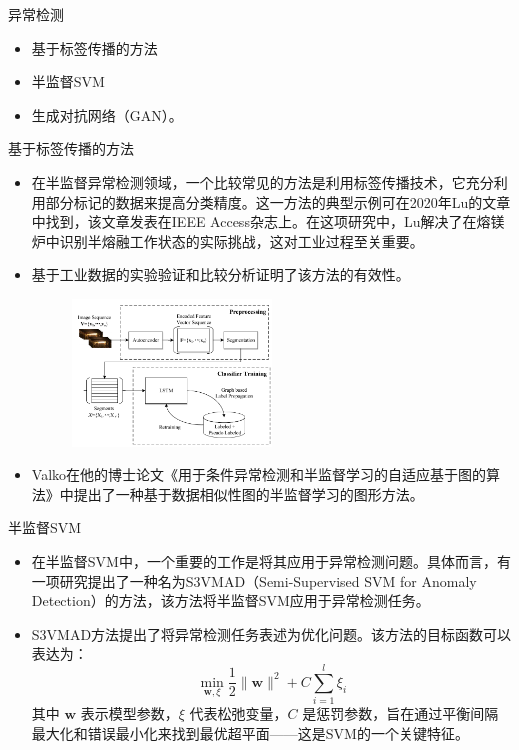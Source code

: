 \documentclass[UTF8]{beamer}
\begin{document}
\begin{frame}{异常检测}
    \begin{itemize}
        \item 基于标签传播的方法
        \item 半监督SVM
        \item 生成对抗网络（GAN）。
    \end{itemize}
\end{frame}

\begin{frame}{基于标签传播的方法}
    \scriptsize
    \begin{itemize}
        \item 在半监督异常检测领域，一个比较常见的方法是利用标签传播技术，它充分利用部分标记的数据来提高分类精度。这一方法的典型示例可在2020年Lu的文章中找到，该文章发表在IEEE Access杂志上。在这项研究中，Lu解决了在熔镁炉中识别半熔融工作状态的实际挑战，这对工业过程至关重要。
        \item 基于工业数据的实验验证和比较分析证明了该方法的有效性。

        \begin{figure}[H]
            \centering
            \includegraphics[width=0.5\textwidth]{img/4-Anomaly Detection/3.png}
        \end{figure}

        \item Valko在他的博士论文《用于条件异常检测和半监督学习的自适应基于图的算法》中提出了一种基于数据相似性图的半监督学习的图形方法。
    \end{itemize}
\end{frame}

\begin{frame}{半监督SVM}
    \small
    \begin{itemize}
        \item 在半监督SVM中，一个重要的工作是将其应用于异常检测问题。具体而言，有一项研究提出了一种名为S3VMAD（Semi-Supervised SVM for Anomaly Detection）的方法，该方法将半监督SVM应用于异常检测任务。
        \item S3VMAD方法提出了将异常检测任务表述为优化问题。该方法的目标函数可以表达为：
        \begin{equation}
        \min_{\mathbf{w},\xi} \frac{1}{2} \|\mathbf{w}\|^2 + C \sum_{i=1}^l \xi_i
        \end{equation}
        其中 $\mathbf{w}$ 表示模型参数，$\xi$ 代表松弛变量，$C$ 是惩罚参数，旨在通过平衡间隔最大化和错误最小化来找到最优超平面——这是SVM的一个关键特征。
    \end{itemize}
\end{frame}
\end{document}
